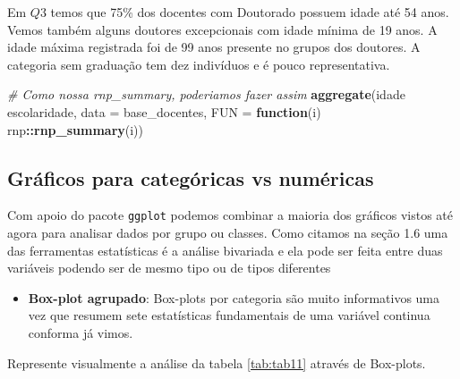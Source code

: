 \documentclass[11pt,]{style/krantz}
\makeatletter
\newenvironment{Shaded}{\begin{snugshade}}{\end{snugshade}}
\newcommand{\CommentTok}[1]{\textcolor[rgb]{0.56,0.35,0.01}{\textit{#1}}}
\newcommand{\ControlFlowTok}[1]{\textcolor[rgb]{0.13,0.29,0.53}{\textbf{#1}}}
\newcommand{\DataTypeTok}[1]{\textcolor[rgb]{0.13,0.29,0.53}{#1}}
\newcommand{\KeywordTok}[1]{\textcolor[rgb]{0.13,0.29,0.53}{\textbf{#1}}}
\newcommand{\NormalTok}[1]{#1}
\newcommand{\OperatorTok}[1]{\textcolor[rgb]{0.81,0.36,0.00}{\textbf{#1}}}
\newcommand{\StringTok}[1]{\textcolor[rgb]{0.31,0.60,0.02}{#1}}
\providecommand{\tightlist}{%
  \setlength{\itemsep}{0pt}\setlength{\parskip}{0pt}}
\newenvironment{kframe}{%
\medskip{}
\setlength{\fboxsep}{.8em}
 \def\at@end@of@kframe{}%
 \ifinner\ifhmode%
  \def\at@end@of@kframe{\end{minipage}}%
  \begin{minipage}{\columnwidth}%
 \fi\fi%
 \def\FrameCommand##1{\hskip\@totalleftmargin \hskip-\fboxsep
 \colorbox{shadecolor}{##1}\hskip-\fboxsep
     \hskip-\linewidth \hskip-\@totalleftmargin \hskip\columnwidth}%
 \MakeFramed {\advance\hsize-\width
   \@totalleftmargin\z@ \linewidth\hsize
   \@setminipage}}%
 {\par\unskip\endMakeFramed%
 \at@end@of@kframe}
\renewenvironment{Shaded}{\begin{kframe}}{\end{kframe}}
\theoremstyle{definition}
\theoremstyle{definition}
\theoremstyle{definition}
\theoremstyle{remark}
\let\BeginKnitrBlock\begin \let\EndKnitrBlock\end
\makeatother
\begin{document}
Em \(Q3\) temos que 75\% dos docentes com Doutorado possuem idade até 54 anos. Vemos também alguns doutores excepcionais com idade mínima de 19 anos. A idade máxima registrada foi de 99 anos presente no grupos dos doutores. A categoria sem graduação tem dez indivíduos e é pouco representativa.

\begin{Shaded}
\begin{Highlighting}[]
\CommentTok{# Como nossa rnp_summary, poderiamos fazer assim}
\KeywordTok{aggregate}\NormalTok{(idade }\OperatorTok{~}\StringTok{ }\NormalTok{escolaridade,}
          \DataTypeTok{data =}\NormalTok{ base_docentes,}
          \DataTypeTok{FUN =} \ControlFlowTok{function}\NormalTok{(i) rnp}\OperatorTok{::}\KeywordTok{rnp_summary}\NormalTok{(i))}
\end{Highlighting}
\end{Shaded}

\hypertarget{graficos-para-categoricas-vs-numericas}{%
\subsection{Gráficos para categóricas vs numéricas}\label{graficos-para-categoricas-vs-numericas}}

Com apoio do pacote \texttt{ggplot} podemos combinar a maioria dos gráficos vistos até agora para analisar dados por grupo ou classes. Como citamos na seção 1.6 uma das ferramentas estatísticas é a análise bivariada e ela pode ser feita entre duas variáveis podendo ser de mesmo tipo ou de tipos diferentes

\begin{itemize}
\tightlist
\item
  \textbf{Box-plot agrupado}: Box-plots por categoria são muito informativos uma vez que resumem sete estatísticas fundamentais de uma variável continua conforma já vimos.
\end{itemize}

\BeginKnitrBlock{example}
\protect\hypertarget{exm:unnamed-chunk-83}{}{\label{exm:unnamed-chunk-83} }Represente visualmente a análise da tabela \ref{tab:tab11} através de Box-plots.
\EndKnitrBlock{example}
\end{document}
